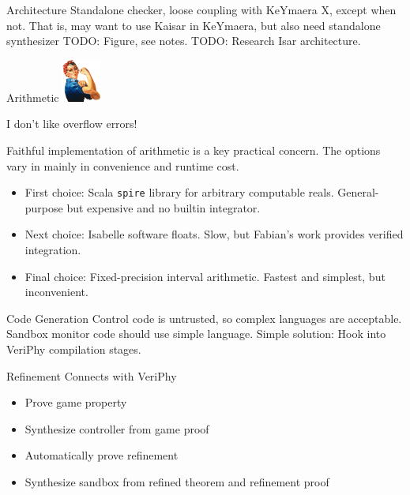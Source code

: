 \documentclass[slidestop,aspectratio=169]{beamer}
\providecommand{\KeYmaeraX}{KeYmaera X\xspace}
\newcommand{\engineer}[1][1in]{\includegraphics[width=#1]{img/rosie.png}}
\newcommand{\speak}[2]{\small\begin{minipage}{1.3in}{#1}{#2}\end{minipage}}
\newcommand{\say}[1]{\speak{#1}{}}
\theoremstyle{plain}
\theoremstyle{definition}
\theoremstyle{remark}
\begin{document}
\begin{frame}[t]{Architecture}
Standalone checker, loose coupling with \KeYmaeraX, except when not.
That is, may want to use Kaisar in KeYmaera, but also need standalone synthesizer
TODO: Figure, see notes.
TODO: Research Isar architecture.
\end{frame}

\begin{frame}[t]{Arithmetic}
\engineer[0.5in]\say{I don't like overflow errors!}

Faithful implementation of arithmetic is a key practical concern.
The options vary in mainly in convenience and runtime cost.
\begin{itemize}
\item First choice:
Scala \texttt{spire} library for arbitrary computable reals.
General-purpose but expensive and no builtin integrator.
\item Next choice:
Isabelle software floats.
Slow, but Fabian's work provides verified integration.
\item Final choice:
Fixed-precision interval arithmetic.
Fastest and simplest, but inconvenient.
\end{itemize}
\end{frame}

\begin{frame}[t]{Code Generation}
Control code is untrusted, so complex languages are acceptable.
Sandbox monitor code should use simple language.
Simple solution: Hook into VeriPhy compilation stages.
\end{frame}

\begin{frame}[t]{Refinement Connects with VeriPhy}
  \begin{itemize}
  \item Prove game property
  \item Synthesize controller from game proof
  \item Automatically prove refinement
  \item Synthesize sandbox from refined theorem and refinement proof
  \end{itemize}
\end{frame}
\end{document}
